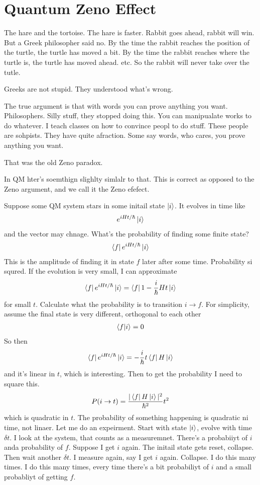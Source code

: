 \section{Quantum Zeno Effect}
The hare and the tortoise.
The hare is faster.
Rabbit goes ahead, rabbit will win.
But a Greek philosopher said no.
By the time the rabbit reaches the position of the turtle,
the turtle has moved a bit.
By the time the rabbit reaches where the turtle is,
the turtle has moved ahead.
etc.
So the rabbit will never take over the tutle.

Greeks are not stupid.
They understood what's wrong.

The true argument is that with words you can prove anything you want.
Philosophers.
Silly stuff, they stopped doing this.
You can manipualate works to do whatever.
I teach classes on how to convince peopl to do stuff.
These people are sohpists.
They have quite afraction.
Some say words, who cares, you prove anything you want.

That was the old Zeno paradox.

In QM hter's soemthign slighlty simlalr to that.
This is correct as opposed to the Zeno argument,
and we call it the Zeno efefect.

Suppose some QM system stars in some initail state $\ket{i}$.
It evolves in time like
\begin{align}
    e^{i Ht/\hbar}\ket{i}
\end{align}
and the vector may chnage.
What's the probability of finding some finite state?
\begin{align}
    \bra{f}e^{i Ht/\hbar}\ket{i}
\end{align}
This is the amplitude of finding it in state $f$ later after some time.
Probability si squred.
If the evolution is very small, I can approximate
\begin{align}
    \bra{f}e^{i Ht/\hbar}\ket{i}
    = \bra{f}
    1 - \frac{i}{\hbar} Ht
    \ket{i}
\end{align}
for small $t$.
Calculate what the probability is to transition $i\to f$.
For simplicity,
assume the final state is very different,
orthogonal to each other
\begin{align}
    \braket{f}{i} = 0
\end{align}
So then
\begin{align}
    \bra{f}e^{i Ht/\hbar}\ket{i}
    = -\frac{i}{\hbar}t \bra{f}H\ket{i}
\end{align}
and it's linear in $t$, which is interesting.
Then to get the probability I need to square this.
\begin{align}
    P(i\to t) = 
    \frac{|\bra{f} H\ket{i}|^2}{\hbar^2}t^2
\end{align}
which is quadratic in $t$.
The probability of something happening is quadratic ni time,
not linaer.
Let me do an expeirment.
Start with state $\ket{i}$,
evolve with time $\delta t$.
I look at the system,
that counts as a measuremnet.
There's a probabiiyt of $i$ anda probability of $f$.
Suppose I get $i$ again.
The initail state gets reset,
collapse.
Then wait another $\delta t$.
I measure again,
say I get $i$ again.
Collapse.
I do this many times.
I do this many times,
every time there's a bit probabiliyt of $i$
and a small probabliyt of getting $f$.

